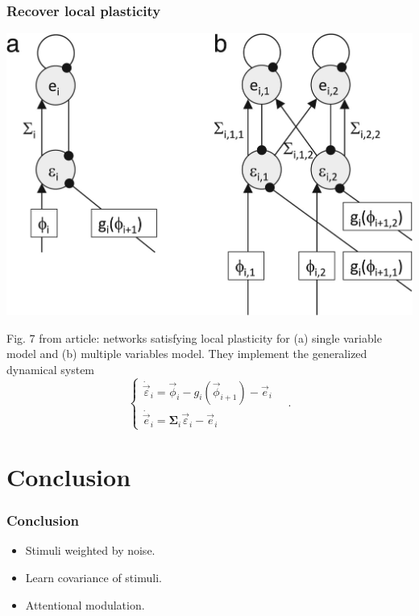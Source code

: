 \documentclass[aspectratio=43]{beamer}
\begin{document}
\begin{frame}
  \frametitle{Recover local plasticity}
  \begin{center}
    \includegraphics[width=0.4\textheight]{Fig7}
  \end{center}
  Fig. 7 from article: networks satisfying local plasticity for (a) single variable model and (b) multiple variables model. They implement the generalized dynamical system
  \begin{equation}
    \label{eq:dynamical_system_prediction_errors}
    \begin{cases}
      \dot{\vec{\varepsilon}}_i = \vec{\phi}_i - g_i(\vec{\phi}_{i+1}) - \vec{e}_i \\
      \dot{\vec{e}}_i = \boldsymbol{\Sigma}_i \vec{\varepsilon}_i - \vec{e}_i
    \end{cases}
    \quad .
  \end{equation}
\end{frame}



\section{Conclusion}
\begin{frame}
  \frametitle{Conclusion}
  \begin{itemize}
    \item Stimuli weighted by noise.
    \item Learn covariance of stimuli.
    \item Attentional modulation.
  \end{itemize}
\end{frame}
\end{document}
